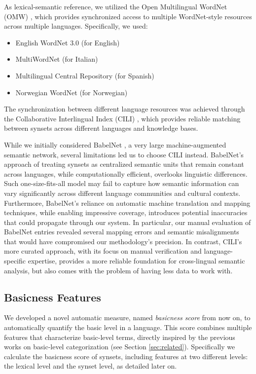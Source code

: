 \documentclass[preprint,12pt,authoryear]{elsarticle}
\begin{document}
As lexical-semantic reference, we utilized the Open Multilingual WordNet (OMW) \cite{vossen_toward_2016}, which provides synchronized access to multiple WordNet-style resources across multiple languages. Specifically, we used:
\begin{itemize}
	\item English WordNet 3.0 (for English)
	\item MultiWordNet (for Italian)
	\item Multilingual Central Repository (for Spanish)
	\item Norwegian WordNet (for Norwegian)
\end{itemize}

The synchronization between different language resources was achieved through the Collaborative Interlingual Index (CILI) \cite{bond_cili_2016}, which provides reliable matching between synsets across different languages and knowledge bases.

While we initially considered BabelNet \cite{navigli_babelnet_2010}, a very large machine-augmented semantic network, several limitations led us to choose CILI instead. BabelNet's approach of treating synsets as centralized semantic units that remain constant across languages, while computationally efficient, overlooks linguistic differences. Such one-size-fits-all model may fail to capture how semantic information can vary significantly across different language communities and cultural contexts. 
Furthermore, BabelNet's reliance on automatic machine translation and mapping techniques, while enabling impressive coverage, introduces potential inaccuracies that could propagate through our system. In particular, our manual evaluation of BabelNet entries revealed several mapping errors and semantic misalignments that would have compromised our methodology's precision. In contrast, CILI's more curated approach, with its focus on manual verification and language-specific expertise, provides a more reliable foundation for cross-lingual semantic analysis, but also comes with the problem of having less data to work with.

\subsection{Basicness Features}
We developed a novel automatic measure, named \textit{basicness score} from now on, to automatically quantify the basic level in a language. This score combines multiple features that characterize basic-level terms, directly inspired by the previous works on basic-level categorization (see Section \ref{sec:related}). Specifically we calculate the basicness score of synsets, including features at two different levels: the lexical level and the synset level, as detailed later on.
\end{document}
